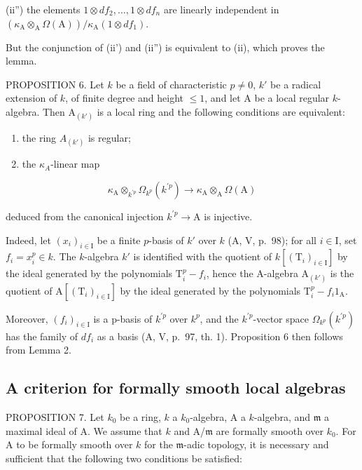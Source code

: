 (ii'') the elements \(1 \otimes df_2, \ldots, 1 \otimes df_n\) are linearly independent in \((\kappa_{\mathrm{A}} \otimes_{\mathrm{A}} \Omega(\mathrm{A})) / \kappa_{\mathrm{A}}(1 \otimes df_1)\).

But the conjunction of (ii') and (ii'') is equivalent to (ii), which proves the lemma.

PROPOSITION 6. Let \(k\) be a field of characteristic \(p \neq 0\), \(k'\) be a radical extension of \(k\), of finite degree and height \(\leqslant 1\), and let A be a local regular \(k\)-algebra. Then \(\mathrm{A}_{(k')}\) is a local ring and the following conditions are equivalent:

\begin{enumerate}
\def\labelenumi{(\roman{enumi})}
\item
  the ring \(A_{(k')}\) is regular;
\item
  the \(\kappa_{A}\)-linear map
\end{enumerate}

\[
\kappa_ {\mathrm{A}} \otimes_ {k ^ {\prime p}} \Omega_ {k ^ {p}} (k ^ {\prime p}) \longrightarrow \kappa_ {\mathrm{A}} \otimes_ {\mathrm{A}} \Omega (\mathrm{A})
\]

deduced from the canonical injection \(k^{\prime p}\to \mathrm{A}\) is injective.

Indeed, let \((x_{i})_{i\in \mathrm{I}}\) be a finite \(p\)-basis of \(k'\) over \(k\) (A, V, p.~98); for all \(i\in \mathrm{I}\), set \(f_{i} = x_{i}^{p}\in k\). The \(k\)-algebra \(k'\) is identified with the quotient of \(k[(\mathrm{T}_i)_{i\in \mathrm{I}}]\) by the ideal generated by the polynomials \(\mathrm{T}_i^p - f_i\), hence the A-algebra \(\mathrm{A}_{(k')}\) is the quotient of \(\mathrm{A}[(\mathrm{T}_i)_{i\in \mathrm{I}}]\) by the ideal generated by the polynomials \(\mathrm{T}_i^p - f_i1_{\mathrm{A}}\).

Moreover, \((f_{i})_{i\in\mathrm{I}}\) is a p-basis of \(k^{\prime p}\) over \(k^{p}\), and the \(k^{\prime p}\)-vector space \(\Omega_{k^{p}}(k^{\prime p})\) has the family of \(df_{i}\) as a basis (A, V, p.~97, th. 1). Proposition 6 then follows from Lemma 2.

\subsection{A criterion for formally smooth local algebras}

PROPOSITION 7. Let \(k_{0}\) be a ring, \(k\) a \(k_{0}\)-algebra, A a \(k\)-algebra, and \(\mathfrak{m}\) a maximal ideal of A. We assume that \(k\) and A/\(\mathfrak{m}\) are formally smooth over \(k_{0}\). For A to be formally smooth over \(k\) for the \(\mathfrak{m}\)-adic topology, it is necessary and sufficient that the following two conditions be satisfied:

